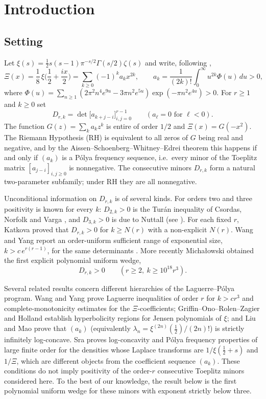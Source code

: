 \documentclass[11pt,a4paper]{article}
\numberwithin{equation}{section}
\theoremstyle{definition}
\theoremstyle{remark}
\begin{document}
\section{Introduction}

\subsection{Setting}
Let $\xi(s)=\tfrac12 s(s-1)\pi^{-s/2}\Gamma(s/2)\zeta(s)$ and write, following \cite{Mich},
\begin{equation}\label{eq:Xi}
\Xi(x)=\frac18\,\xi\Big(\frac12+\frac{ix}{2}\Big)=\sum_{k\ge0}(-1)^ka_kx^{2k},\qquad
a_k=\frac{1}{(2k)!}\int_0^\infty u^{2k}\Phi(u)\,du>0,
\end{equation}
where $\Phi(u)=\sum_{n\ge1}(2\pi^2n^4e^{9u}-3\pi n^2e^{5u})\exp(-\pi n^2e^{4u})>0$.
For $r\ge1$ and $k\ge0$ set
\[
D_{r,k}=\det\big[a_{k+j-i}\big]_{i,j=0}^{r-1}\qquad(a_\ell=0\text{ for }\ell<0).
\]
The function $G(z)=\sum_k a_kz^k$ is entire of order $1/2$ and $\Xi(x)=G(-x^2)$. The Riemann Hypothesis (RH)
is equivalent to all zeros of $G$ being real and negative, and by the Aissen--Schoenberg--Whitney--Edrei theorem
\cite{ASW,Edrei} this happens if and only if $(a_k)$ is a P\'olya frequency sequence, i.e.\ every minor of the
Toeplitz matrix $[a_{j-i}]_{i,j\ge0}$ is nonnegative. The consecutive minors $D_{r,k}$ form a natural
two-parameter subfamily; under RH they are all nonnegative.

Unconditional information on $D_{r,k}$ is of several kinds. For orders two and three positivity is known for every $k$:
$D_{2,k}>0$ is the Turán inequality of Csordas, Norfolk and Varga \cite{CNV}, and $D_{3,k}>0$ is due to Nuttall
\cite{Nuttall} (see \cite{WY}). For each fixed $r$, Katkova \cite{Katkova} proved that $D_{r,k}>0$ for $k\ge N(r)$ with a
non-explicit $N(r)$. Wang and Yang report an order-uniform sufficient range of exponential size, $k>c\,e^{r(r-1)}$, for the
same determinants \cite[Introduction]{WY}. More recently Michałowski \cite{Mich} obtained the first explicit polynomial
uniform wedge,
\begin{equation}\label{eq:cubic}
D_{r,k}>0\qquad(r\ge2,\ k\ge10^{18}r^3).
\end{equation}

Several related results concern different hierarchies of the Laguerre--Pólya program. Wang and Yang \cite{WY} prove
Laguerre inequalities of order $r$ for $k>cr^3$ and complete-monotonicity estimates for the $\Xi$-coefficients;
Griffin--Ono--Rolen--Zagier \cite{GORZ} and Holland \cite{Holland} establish hyperbolicity regions for Jensen
polynomials of $\xi$; and Liu and Mao \cite{LM} prove that $(a_k)$ (equivalently $\lambda_n=\xi^{(2n)}(\tfrac12)/(2n)!$)
is strictly infinitely log-concave. Sra \cite{Sra} proves log-concavity and Pólya frequency properties of large
finite order for the densities whose Laplace transforms are $1/\xi(\tfrac12+s)$ and $1/\Xi$, which are different objects
from the coefficient sequence $(a_k)$. These conditions do not imply positivity of the order-$r$ consecutive Toeplitz minors
considered here. To the best of our knowledge, the result below is the first polynomial uniform wedge for these minors
with exponent strictly below three.
\end{document}

